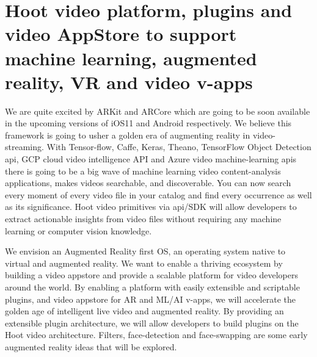 \documentclass{article}
\begin{document}


\section{Hoot video platform, plugins and video AppStore to support machine learning, augmented reality, VR and video v-apps}
We are quite excited by ARKit and ARCore which are going to be soon available in the upcoming versions of iOS11 and Android respectively. We believe this framework is going to usher a golden era of augmenting reality in video-streaming. With Tensor-flow, Caffe, Keras, Theano, TensorFlow Object Detection api, GCP cloud video intelligence API and Azure video machine-learning apis there is going to be a big wave of machine learning video content-analysis applications, makes videos searchable, and discoverable. You can now search every moment of every video file in your catalog and find every occurrence as well as its significance. Hoot video primitives via api/SDK will allow developers to extract actionable insights from video files without requiring any machine learning or computer vision knowledge. 

We envision an Augmented Reality first OS, an operating system native to virtual and augmented reality. We want to enable a thriving ecosystem by building a video appstore and provide a scalable platform for video developers around the world. By enabling a platform with easily extensible and scriptable plugins, and video appstore for AR and ML/AI v-apps, we will accelerate the golden age of intelligent live video and augmented reality. By providing an extensible plugin architecture, we will allow developers to build plugins on the Hoot video architecture. Filters, face-detection and face-swapping are some early augmented reality ideas that will be explored.

\end{document}

